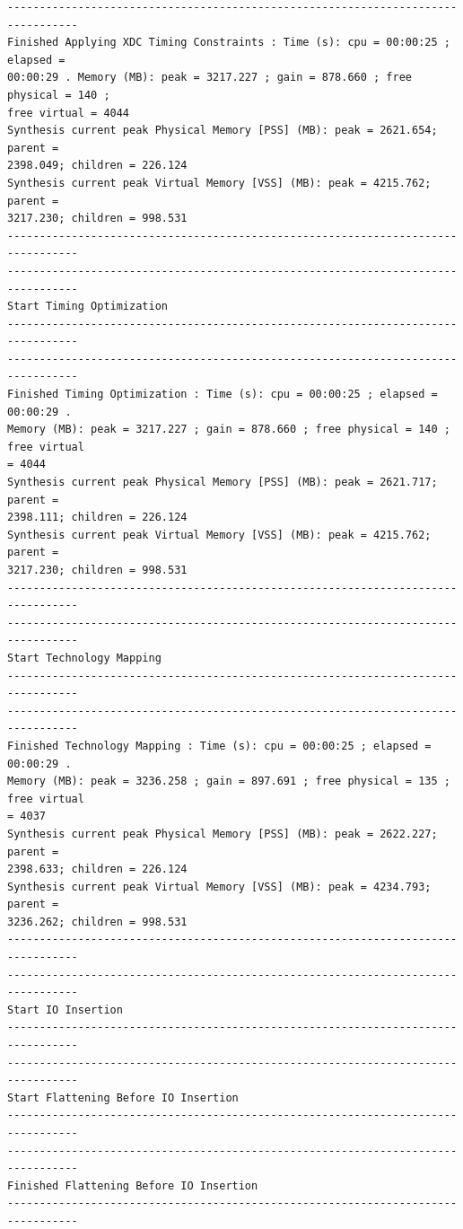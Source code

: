 \documentclass{article}
\begin{document}
\begin{lstlisting}
---------------------------------------------------------------------------------
Finished Applying XDC Timing Constraints : Time (s): cpu = 00:00:25 ; elapsed = 
00:00:29 . Memory (MB): peak = 3217.227 ; gain = 878.660 ; free physical = 140 ; 
free virtual = 4044
Synthesis current peak Physical Memory [PSS] (MB): peak = 2621.654; parent = 
2398.049; children = 226.124
Synthesis current peak Virtual Memory [VSS] (MB): peak = 4215.762; parent = 
3217.230; children = 998.531
---------------------------------------------------------------------------------
---------------------------------------------------------------------------------
Start Timing Optimization
---------------------------------------------------------------------------------
---------------------------------------------------------------------------------
Finished Timing Optimization : Time (s): cpu = 00:00:25 ; elapsed = 00:00:29 . 
Memory (MB): peak = 3217.227 ; gain = 878.660 ; free physical = 140 ; free virtual 
= 4044
Synthesis current peak Physical Memory [PSS] (MB): peak = 2621.717; parent = 
2398.111; children = 226.124
Synthesis current peak Virtual Memory [VSS] (MB): peak = 4215.762; parent = 
3217.230; children = 998.531
---------------------------------------------------------------------------------
---------------------------------------------------------------------------------
Start Technology Mapping
---------------------------------------------------------------------------------
---------------------------------------------------------------------------------
Finished Technology Mapping : Time (s): cpu = 00:00:25 ; elapsed = 00:00:29 . 
Memory (MB): peak = 3236.258 ; gain = 897.691 ; free physical = 135 ; free virtual 
= 4037
Synthesis current peak Physical Memory [PSS] (MB): peak = 2622.227; parent = 
2398.633; children = 226.124
Synthesis current peak Virtual Memory [VSS] (MB): peak = 4234.793; parent = 
3236.262; children = 998.531
---------------------------------------------------------------------------------
---------------------------------------------------------------------------------
Start IO Insertion
---------------------------------------------------------------------------------
---------------------------------------------------------------------------------
Start Flattening Before IO Insertion
---------------------------------------------------------------------------------
---------------------------------------------------------------------------------
Finished Flattening Before IO Insertion
---------------------------------------------------------------------------------

\end{lstlisting}
\end{document}
